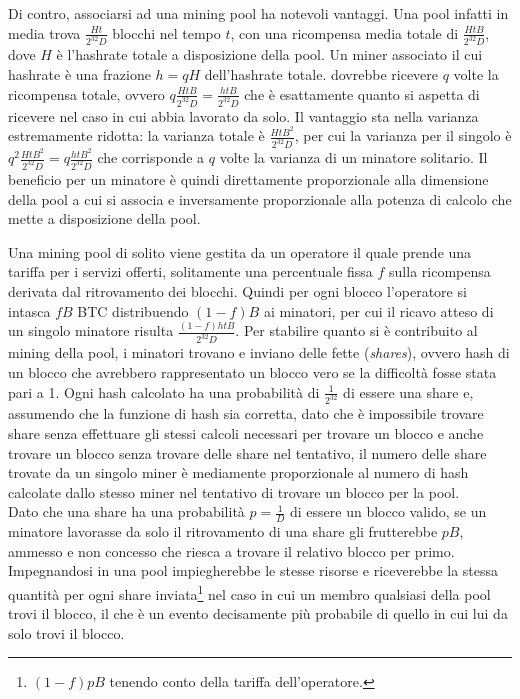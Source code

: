 Di contro, associarsi ad una mining pool ha notevoli vantaggi. Una pool infatti in media trova $\frac{Ht}{2^{32}D}$ blocchi nel tempo $t$, con una ricompensa media totale di $\frac{HtB}{2^{32}D}$, dove $H$ è l'hashrate totale a disposizione della pool. Un miner associato il cui hashrate è una frazione $h = qH$ dell'hashrate totale. dovrebbe ricevere $q$ volte la ricompensa totale, ovvero $q\frac{HtB}{2^{32}D} = \frac{htB}{2^{32}D}$ che è esattamente quanto si aspetta di ricevere nel caso in cui abbia lavorato da solo. Il vantaggio sta nella varianza estremamente ridotta: la varianza totale è $\frac{HtB^2}{2^{32}D}$, per cui la varianza per il singolo è $q^2 \frac{HtB^2}{2^{32}D} = q\frac{htB^2}{2^{32}D}$ che corrisponde a $q$ volte la varianza di un minatore solitario. Il beneficio per un minatore è quindi direttamente proporzionale alla dimensione della pool a cui si associa e inversamente proporzionale alla potenza di calcolo che mette a disposizione della pool.

Una mining pool di solito viene gestita da un operatore il quale prende una tariffa per i servizi offerti, solitamente una percentuale fissa $f$ sulla ricompensa derivata dal ritrovamento dei blocchi. Quindi per ogni blocco l'operatore si intasca $fB$ BTC distribuendo $(1-f)B$ ai minatori, per cui il ricavo atteso di un singolo minatore risulta $\frac{(1-f)htB}{2^{32}D}$.
Per stabilire quanto si è contribuito al mining della pool, i minatori trovano e inviano delle fette (\emph{shares}), ovvero hash di un blocco che avrebbero rappresentato un blocco vero se la difficoltà fosse stata pari a 1. Ogni hash calcolato ha una probabilità di $\frac{1}{2^32}$ di essere una share e, assumendo che la funzione di hash sia corretta, dato che è impossibile trovare share senza effettuare gli stessi calcoli necessari per trovare un blocco e anche trovare un blocco senza trovare delle share nel tentativo, il numero delle share trovate da un singolo miner è mediamente proporzionale al numero di hash calcolate dallo stesso miner nel tentativo di trovare un blocco per la pool.\\
Dato che una share ha una probabilità $p = \frac{1}{D}$ di essere un blocco valido, se un minatore lavorasse da solo il ritrovamento di una share gli frutterebbe $pB$, ammesso e non concesso che riesca a trovare il relativo blocco per primo. Impegnandosi in una pool impiegherebbe le stesse risorse e riceverebbe la stessa quantità per ogni share inviata\footnote{$(1-f)pB$ tenendo conto della tariffa dell'operatore.} nel caso in cui un membro qualsiasi della pool trovi il blocco, il che è un evento decisamente più probabile di quello in cui lui da solo trovi il blocco.\\

